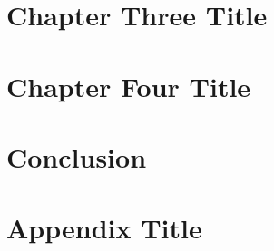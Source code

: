 \documentclass[12pt,twoside]{book}
\begin{document}
\chapter{Chapter Three Title}


\chapter{Chapter Four Title}


\chapter{Conclusion}


\appendix
\chapter{Appendix Title}


\printbibliography
\end{document}
